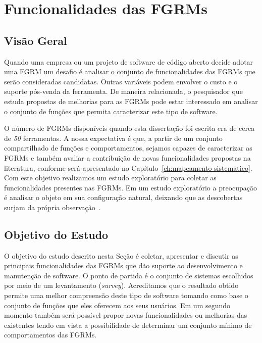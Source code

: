 \section{Funcionalidades das FGRMs}\label{sec:caracterizacao_ferramentas}

\subsection{Visão Geral}\label{subsec:caracterizacao_intro}

Quando uma empresa ou um projeto de software de código aberto decide adotar uma
FGRM um desafio é analisar o conjunto de funcionalidades das FGRMs que serão
consideradas candidatas. Outras variáveis podem envolver o custo e o suporte
pós-venda da ferramenta. De maneira relacionada, o pesquisador que estuda
propostas de melhorias para as FGRMs pode estar interessado em analisar o
conjunto de funções que permita caracterizar este tipo de software.

O número de FGRMs disponíveis quando esta dissertação foi escrita era de cerca
de \textit{50} ferramentas. A nossa expectativa é que, a partir de um conjunto
compartilhado de funções e comportamentos, sejamos capazes de caracterizar as
FGRMs e também avaliar a contribuição de novas funcionalidades propostas na
li\-te\-ra\-tu\-ra, conforme será apresentado no
Capítulo~\ref{ch:mapeamento-sistematico}. Com este objetivo realizamos um
estudo exploratório para coletar as funcionalidades presentes nas FGRMs. Em um
estudo exploratório a preocupação é analisar o objeto em sua configuração
natural, deixando que as descobertas surjam da própria
observação~\cite{wohlin2012experimentation}.

\subsection{Objetivo do Estudo}\label{subsec:caracterizacao_objetivo_do_capitulo}

O objetivo do estudo descrito nesta Seção é coletar, apresentar e discutir as
principais funcionalidades das FGRMs que dão suporte ao desenvolvimento e
manutenção de software. O ponto de partida é o conjunto de sistemas escolhidos
por meio de um levantamento (\textit{survey}). Acreditamos que o resultado
obtido permite uma melhor compreensão deste tipo de software tomando como base
o conjunto de funções que eles oferecem aos seus usuários. Em um segundo
momento também será possível propor novas funcionalidades ou melhorias das
existentes tendo em vista a possibilidade de determinar um conjunto mínimo de
comportamentos das FGRMs.

